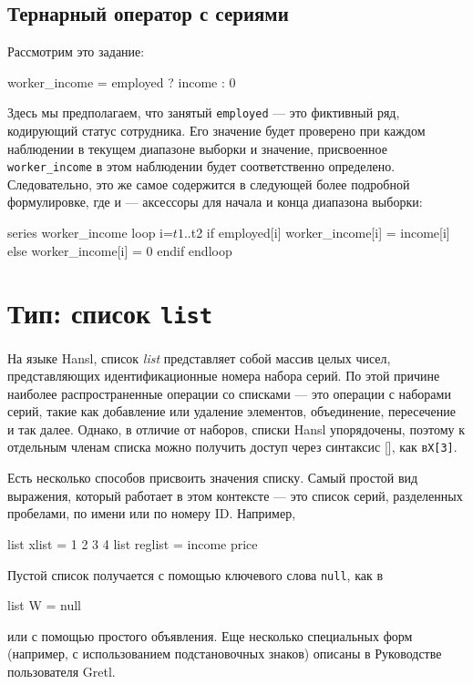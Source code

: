 \subsection{Тернарный оператор с сериями}

Рассмотрим это задание:

\begin{code}
  worker_income = employed ? income : 0
\end{code}
Здесь мы предполагаем, что занятый \verb|employed| --- это фиктивный
ряд, кодирующий статус сотрудника. Его значение будет проверено при
каждом наблюдении в текущем диапазоне выборки и значение, присвоенное
\texttt{worker\_income} в этом наблюдении будет соответственно
определено. Следовательно, это же самое содержится в следующей более
подробной формулировке, где  и  --- аксессоры
для начала и конца диапазона выборки:

\begin{code}
series worker_income
loop i=$t1..$t2
    if employed[i]
        worker_income[i] = income[i]
    else
        worker_income[i] = 0
    endif
endloop
\end{code}

\section{Тип: список \texttt{list}}
\label{sec:lists}

На языке Hansl, список \textit{list} представляет собой массив целых
чисел, представляющих идентификационные номера набора серий. По этой
причине наиболее распространенные операции со списками --- это
операции с наборами серий, такие как добавление или удаление
элементов, объединение, пересечение и так далее. Однако, в отличие от
наборов, списки Hansl упорядочены, поэтому к отдельным членам списка
можно получить доступ через синтаксис [], как в\texttt{X[3]}.

Есть несколько способов присвоить значения списку. Самый простой вид
выражения, который работает в этом контексте --- это список серий,
разделенных пробелами, по имени или по номеру ID. Например,

\begin{code}
list xlist = 1 2 3 4
list reglist = income price 
\end{code}
Пустой список получается с помощью ключевого слова \texttt{null}, как
в
\begin{code}
list W = null  
\end{code}
или с помощью простого объявления. Еще несколько специальных форм
(например, с использованием подстановочных знаков) описаны в
Руководстве пользователя Gretl.

